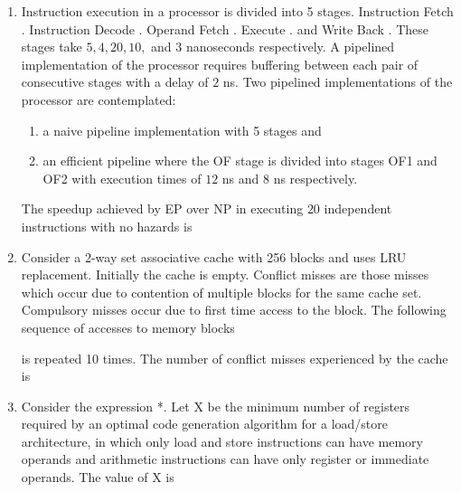 \documentclass[a4paper, 11pt]{article}
\begin{document}
\begin{enumerate}
    \hfill{}

    \item Instruction execution in a processor is divided into 5 stages. Instruction Fetch . Instruction Decode . Operand Fetch . Execute . and Write Back . These stages take $5, 4, 20, 10,$ and $3$ nanoseconds  respectively. A pipelined implementation of the processor requires buffering between each pair of consecutive stages with a delay of $2$ ns. Two pipelined implementations of the processor are contemplated:
    \begin{enumerate}[label=\Roman*]        
            \item a naive pipeline implementation  with 5 stages and
            \item an efficient pipeline  where the OF stage is divided into stages OF1 and OF2 with execution times of $12$ ns and $8$ ns respectively.
    \end{enumerate}    
    The speedup  achieved by EP over NP in executing $20$ independent instructions with no hazards is \underline{\hspace{2cm}}

    \hfill{}
    
    \item Consider a 2-way set associative cache with 256 blocks and uses LRU replacement. Initially the cache is empty. Conflict misses are those misses which occur due to contention of multiple blocks for the same cache set. Compulsory misses occur due to first time access to the block. The following sequence of accesses to memory blocks
    
    
    is repeated 10 times. The number of conflict misses experienced by the cache is \underline{\hspace{2cm}}
    
    \hfill{}
    
    \item Consider the expression *. Let X be the minimum number of registers required by an optimal code generation  algorithm for a load/store architecture, in which  only load and store instructions can have memory operands and  arithmetic instructions can have only register or immediate operands. The value of X is \underline{\hspace{2cm}}
    

\end{enumerate}
\end{document}
